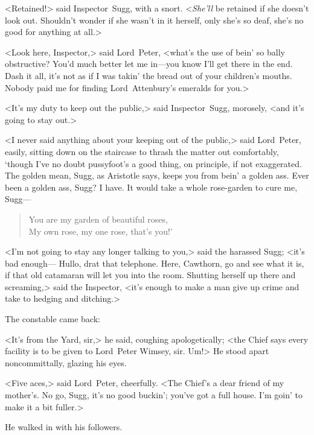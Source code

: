 <Retained!> said Inspector~Sugg, with a snort. <\emph{She'll} be retained if she doesn't look out. Shouldn't wonder if she wasn't in it herself, only she's so deaf, she's no good for anything at all.>

<Look here, Inspector,> said Lord~Peter, <what's the use of bein' so bally obstructive? You'd much better let me in—you know I'll get there in the end. Dash it all, it's not as if I was takin' the bread out of your children's mouths. Nobody paid me for finding Lord~Attenbury's emeralds for you.>

<It's my duty to keep out the public,> said Inspector~Sugg, morosely, <and it's going to stay out.>

<I never said anything about your keeping out of the public,> said Lord~Peter, easily, sitting down on the staircase to thrash the matter out comfortably, `though I've no doubt pussyfoot's a good thing, on principle, if not exaggerated. The golden mean, Sugg, as Aristotle says, keeps you from bein' a golden ass. Ever been a golden ass, Sugg? I have. It would take a whole rose-garden to cure me, Sugg—

\begin{verse}
You are my garden of beautiful roses,\\
My own rose, my one rose, that's you!'
\end{verse}

<I'm not going to stay any longer talking to you,> said the harassed Sugg; <it's bad enough— Hullo, drat that telephone. Here, Cawthorn, go and see what it is, if that old catamaran will let you into the room. Shutting herself up there and screaming,> said the Inspector, <it's enough to make a man give up crime and take to hedging and ditching.>

The constable came back:

<It's from the Yard, sir,> he said, coughing apologetically; <the Chief says every facility is to be given to Lord~Peter Wimsey, sir. Um!> He stood apart noncommittally, glazing his eyes.

<Five aces,> said Lord~Peter, cheerfully. <The Chief's a dear friend of my mother's. No go, Sugg, it's no good buckin'; you've got a full house. I'm goin' to make it a bit fuller.>

He walked in with his followers.

